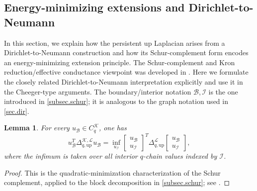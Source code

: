 \documentclass{article}
\newtheorem{lemma}{Lemma}[section]
\newcommand{\KK}{\mathcal{K}}
\newcommand{\LL}{\mathcal{L}}
\begin{document}
\subsection{Energy-minimizing extensions and Dirichlet-to-Neumann}

In this section, we explain how the persistent up Laplacian arises from a Dirichlet-to-Neumann construction and how its Schur-complement form encodes an energy-minimizing extension principle. 
The
 Schur-complement and Kron reduction/effective conductance viewpoint was developed in \cite{pers_lap}.
 Here we formulate the closely related Dirichlet-to-Neumann interpretation explicitly and use it in the Cheeger-type arguments.
The boundary/interior notation $\mathcal{B},\mathcal{I}$ is the one introduced in \cref{subsec.schur}; it is analogous to the graph notation used in \cref{sec.dir}. 


\begin{lemma}\label{lemma:schur_optimization}
For every $u_{\mathcal{B}}\in C_q^\KK$, one has
\[
u_{\mathcal{B}}^T\Delta_{q,\mathrm{up}}^{\KK,\LL}u_{\mathcal{B}}=\inf_{u_{\mathcal{I}}}\begin{bmatrix}u_{\mathcal{B}}\\u_{\mathcal{I}}\end{bmatrix}^T\Delta_{q,\mathrm{up}}^\LL\begin{bmatrix}u_{\mathcal{B}}\\u_{\mathcal{I}}\end{bmatrix},
\]
where the infimum is taken over all interior $q$-chain values indexed by $\mathcal{I}$.
\end{lemma}

\begin{proof}
This is the quadratic-minimization characterization of the Schur complement, applied to the block decomposition in \cref{subsec.schur}; see \cite[Appendix A.5.5]{MR2061575}.
\end{proof}
\end{document}
